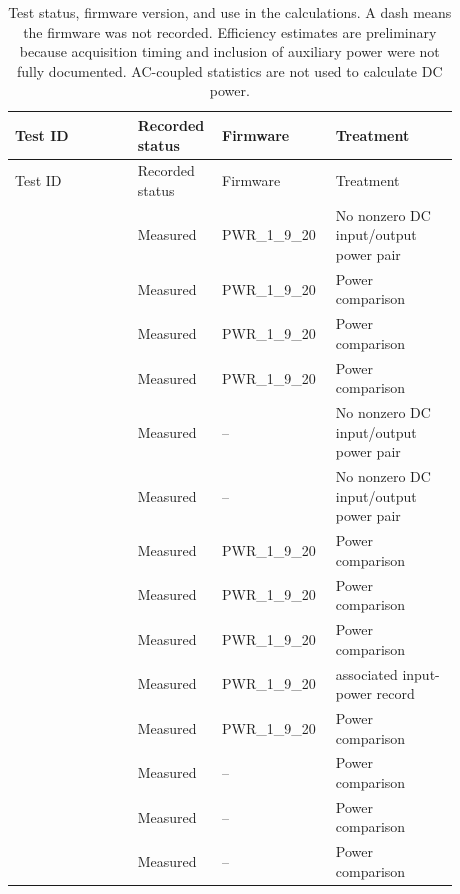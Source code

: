 \begin{landscape}
\begingroup
\scriptsize
\setlength{\tabcolsep}{3pt}
\renewcommand{\arraystretch}{1.12}
\begin{longtable}{@{}L{0.2604\linewidth} L{0.1347\linewidth} L{0.2155\linewidth} L{0.2694\linewidth}@{}}
\caption{Test status, firmware version, and use in the calculations. A dash means the firmware was not recorded. Efficiency estimates are preliminary because acquisition timing and inclusion of auxiliary power were not fully documented. AC-coupled statistics are not used to calculate DC power.}\label{tab:appendix-record-metadata}\\
\toprule
Test ID & Recorded status & Firmware & Treatment\\
\midrule
\endfirsthead
\toprule
Test ID & Recorded status & Firmware & Treatment\\
\midrule
\endhead
{} & Measured & PWR\_1\_9\_20 & No nonzero DC input/output power pair\\
 & Measured & PWR\_1\_9\_20 & Power comparison\\
 & Measured & PWR\_1\_9\_20 & Power comparison\\
 & Measured & PWR\_1\_9\_20 & Power comparison\\
 & Measured & -- & No nonzero DC input/output power pair\\
 & Measured & -- & No nonzero DC input/output power pair\\
 & Measured & PWR\_1\_9\_20 & Power comparison\\
 & Measured & PWR\_1\_9\_20 & Power comparison\\
 & Measured & PWR\_1\_9\_20 & Power comparison\\
 & Measured & PWR\_1\_9\_20 & associated input-power record\\
 & Measured & PWR\_1\_9\_20 & Power comparison\\
 & Measured & -- & Power comparison\\
 & Measured & -- & Power comparison\\
 & Measured & -- & Power comparison\\

\end{longtable}
\end{landscape}
